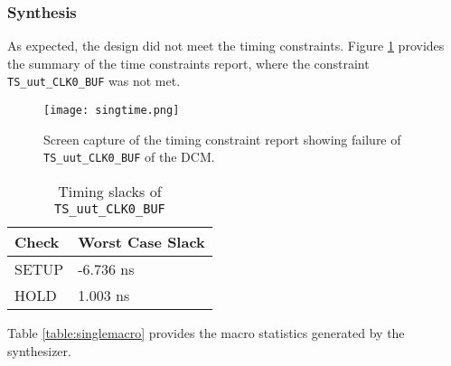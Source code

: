 \documentclass[paper=usletter, fontsize=12pt]{article}
\begin{document}
        \subsubsection{Synthesis} As expected, the design did not meet the
        timing constraints. Figure \ref{fig:singtime} provides the summary of
        the time constraints report, where the constraint
        \texttt{TS\_uut\_CLK0\_BUF} was not met.

        \begin{figure}[ht]
            \begin{center}
                \texttt{[image: singtime.png]}
                \caption{Screen capture of the timing constraint report showing
                failure of \texttt{TS\_uut\_CLK0\_BUF} of the DCM.}
                \label{fig:singtime}
            \end{center}
        \end{figure}

        \begin{table}[h]
            \caption{Timing slacks of \texttt{TS\_uut\_CLK0\_BUF}}
            \label{table:singslacks}
            \centering
            \begin{tabular}{ m{5em}m{10em} }
                \hline
                \textbf{Check}  &   \textbf{Worst Case Slack} \\
                \hline
                SETUP           &   -6.736 ns \\
                HOLD            &   1.003 ns \\
                \hline
            \end{tabular}
        \end{table}

        Table \ref{table:singlemacro} provides the macro statistics generated
        by the synthesizer.
\end{document}
